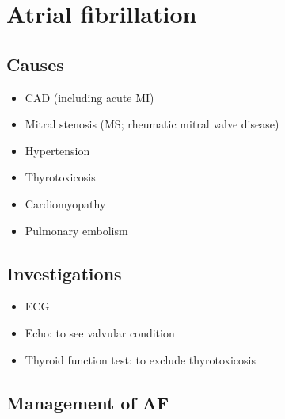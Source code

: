 \documentclass[
  12pt,
]{memoir}
\providecommand{\tightlist}{%
  \setlength{\itemsep}{0pt}\setlength{\parskip}{0pt}}
\begin{document}
\hypertarget{atrial-fibrillation}{%
\section{Atrial fibrillation}\label{atrial-fibrillation}}

\hypertarget{causes}{%
\subsection{Causes}\label{causes}}

\begin{itemize}
\tightlist
\item
  CAD (including acute MI)
\item
  Mitral stenosis (MS; rheumatic mitral valve disease)
\item
  Hypertension
\item
  Thyrotoxicosis
\item
  Cardiomyopathy
\item
  Pulmonary embolism
\end{itemize}

\hypertarget{investigations}{%
\subsection{Investigations}\label{investigations}}

\begin{itemize}
\tightlist
\item
  ECG
\item
  Echo: to see valvular condition
\item
  Thyroid function test: to exclude thyrotoxicosis
\end{itemize}

\hypertarget{management-of-af}{%
\subsection{Management of AF}\label{management-of-af}}
\end{document}

